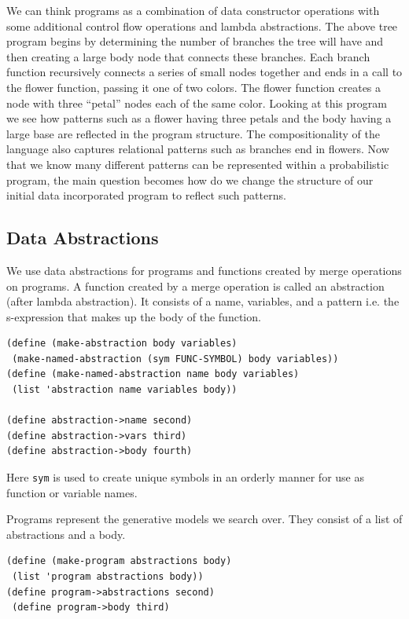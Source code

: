 \documentclass[a4paper,10pt]{article}
\begin{document}
We can think programs as a combination of data constructor operations with some additional control flow operations and lambda abstractions.  The above tree program begins by determining the number of branches the tree will have and then creating a large body node that connects these branches.  Each branch function recursively connects a series of small nodes together and ends in a call to the flower function, passing it one of two colors.  The flower function creates a node with three ``petal'' nodes each of the same color.  Looking at this program we see how patterns such as a flower having three petals and the body having a large base are reflected in the program structure.  The compositionality of the language also captures relational patterns such as branches end in flowers.  Now that we know many different patterns can be represented within a probabilistic program, the main question becomes how do we change the structure of our initial data incorporated program to reflect such patterns.

\subsection{Data Abstractions}
We use data abstractions for programs and functions created by merge operations on programs.  A function created by a merge operation is called an abstraction (after lambda abstraction).  It consists of a name, variables, and a pattern i.e. the s-expression that makes up the body of the function.  
\begin{lstlisting}[frame=trBL]
(define (make-abstraction body variables)
 (make-named-abstraction (sym FUNC-SYMBOL) body variables))
(define (make-named-abstraction name body variables)
 (list 'abstraction name variables body))

(define abstraction->name second)
(define abstraction->vars third)
(define abstraction->body fourth)
\end{lstlisting}
Here \texttt{sym} is used to create unique symbols in an orderly manner for use as function or variable names.


Programs represent the generative models we search over.  They consist of a list of abstractions and a body.
\begin{lstlisting}[frame=trBL]
(define (make-program abstractions body)
 (list 'program abstractions body))
(define program->abstractions second)
 (define program->body third)
\end{lstlisting}  
\end{document}
